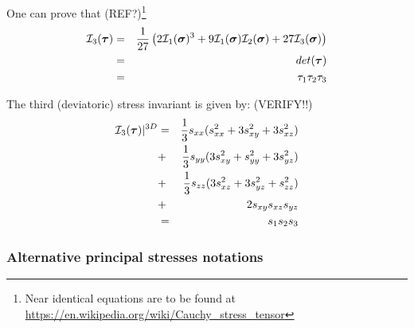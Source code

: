 {\color{gray} 
One can prove that (REF?)\footnote{Near identical equations are to be found at 
\url{https://en.wikipedia.org/wiki/Cauchy_stress_tensor}} 
\begin{eqnarray}
{\cal I}_3({\bm \tau}) 
&=& \frac{1}{27} \left( 2 {\cal I}_1({\bm \sigma})^3 + 
9 {\cal I}_1({\bm \sigma}) {\cal I}_2({\bm \sigma}) 
+27 {\cal I}_3({\bm \sigma})   \right) \nonumber\\
&=& det ({\bm\tau}) \nonumber\\
&=& \tau_1 \tau_2\tau_3 \nonumber\\
\end{eqnarray}

The third (deviatoric) stress invariant is given by: (VERIFY!!)
\begin{eqnarray}
{\cal I}_3({\bm \tau})|^{3D} 
&=&  \frac{1}{3} s_{xx} (s_{xx}^2 + 3  s_{xy}^2   + 3  s_{xz}^2  )     \nonumber\\
&+& \frac{1}{3} s_{yy} (3s_{xy}^2 +  s_{yy}^2   + 3  s_{yz}^2  )     \nonumber\\
&+& \frac{1}{3} s_{zz} ( 3 s_{xz}^2  + 3 s_{yz}^2 +s_{zz}^2)       \nonumber\\
&+& 2   s_{xy} s_{xz} s_{yz}   \nonumber \\
&=& s_1 s_2 s_3 \nonumber
\end{eqnarray}

}

\subsubsection{Alternative principal stresses notations}\label{sec:altinv}

